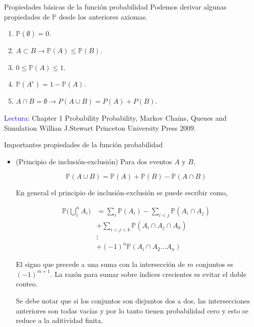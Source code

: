 \documentclass{beamer}
\begin{document}
\begin{frame}{Propiedades b\'asicas de la funci\'on  probabilidad}
Podemos derivar algunas propiedades de $\mathbb{P}$ desde los anteriores axiomas. 

\begin{enumerate}
	\item $\mathbb{P}(\emptyset ) = 0$.
	\item $A \subset B \rightarrow \mathbb{P}(A) \leq \mathbb{P}(B)$.
	\item $0 \leq \mathbb{P}(A) \leq 1$.
	\item $ \mathbb{P}(A^c) = 1-\mathbb{P}(A)$.
	\item $A \cap B = \emptyset \rightarrow  P(A \cup B) = P(A) + P(B)$.
\end{enumerate}	

\vspace{0.2cm}

\scriptsize{\textcolor{blue}{Lectura:} Chapter 1 Probability Probability, Markov Chains, Queues and Simulation Willian J.Stewart Princeton University Press 2009.}
\end{frame}

\begin{frame}{Importantes propiedades de la funci\'on  probabilidad}

\begin{itemize}
\item \scriptsize{(Principio de inclusi\'on-exclusi\'on) Para dos eventos $A$ y $B$,
	
	\[
	\mathbb{P}(A\cup B) = \mathbb{P}(A) + \mathbb{P}(B) -\mathbb{P}(A \cap B)
	\]
	

En general el principio de inclusi\'on-exclusi\'on  se puede escribir como,

\vspace{0.2cm}

\begin{align*}
\mathbb{P}\Biggl(\bigcup_{i}^{n} A_i\Biggr) & = \sum_{i}\mathbb{P}(A_i) -\sum_{i < j}\mathbb{P}(A_i \cap A_j)\\
&  + \sum_{i < j < k}\mathbb{P}(A_i \cap A_j \cap A_k)\\
&  \vdots \\
& + (-1)^n\mathbb{P}(A_i \cap A_2 \dots A_n)
\end{align*}

El signo que precede a una suma con la intersecci\'on de $m$ conjuntos es $(-1)^{m + 1}$. La raz\'on para sumar sobre \'indices crecientes es evitar el doble conteo.

\vspace{0.2cm}

Se debe notar  que si los conjuntos son disjuntos dos a dos, las intersecciones anteriores son todas vac\'ias y por lo tanto tienen probabilidad cero y esto se reduce a la aditividad finita.}
\end{itemize}
\end{frame}
\end{document}
